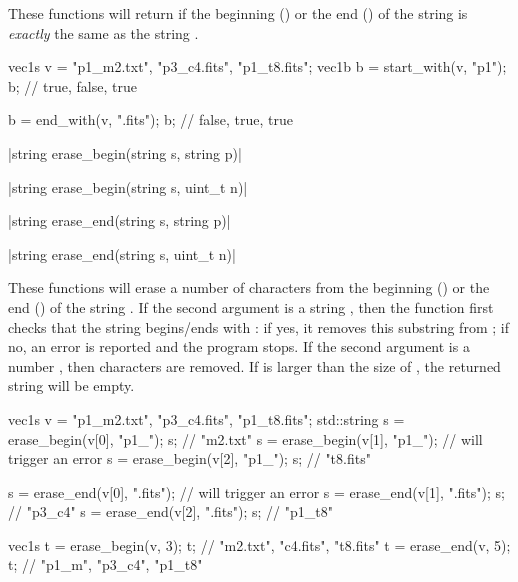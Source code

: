 These functions will return \cpptrue if the beginning () or the end () of the string  is \emph{exactly} the same as the string .

\begin{example}
\begin{cppcode}
vec1s v = {"p1_m2.txt", "p3_c4.fits", "p1_t8.fits"};
vec1b b = start_with(v, "p1");
b; // {true, false, true}

b = end_with(v, ".fits");
b; // {false, true, true}
\end{cppcode}
\end{example}

\item \vectorfunc \cppinline|string erase_begin(string s, string p)| 

\vectorfunc \cppinline|string erase_begin(string s, uint_t n)|

\vectorfunc \cppinline|string erase_end(string s, string p)| 

\vectorfunc \cppinline|string erase_end(string s, uint_t n)|

These functions will erase a number of characters from the beginning () or the end () of the string . If the second argument is a string , then the function first checks that the string begins/ends with : if yes, it removes this substring from ; if no, an error is reported and the program stops. If the second argument is a number , then  characters are removed. If  is larger than the size of , the returned string will be empty.

\begin{example}
\begin{cppcode}
vec1s v = {"p1_m2.txt", "p3_c4.fits", "p1_t8.fits"};
std::string s = erase_begin(v[0], "p1_");
s; // "m2.txt"
s = erase_begin(v[1], "p1_");
// will trigger an error
s = erase_begin(v[2], "p1_");
s; // "t8.fits"

s = erase_end(v[0], ".fits");
// will trigger an error
s = erase_end(v[1], ".fits");
s; // "p3_c4"
s = erase_end(v[2], ".fits");
s; // "p1_t8"

vec1s t = erase_begin(v, 3);
t; // {"m2.txt", "c4.fits", "t8.fits"}
t = erase_end(v, 5);
t; // {"p1_m", "p3_c4", "p1_t8"}
\end{cppcode}
\end{example}

